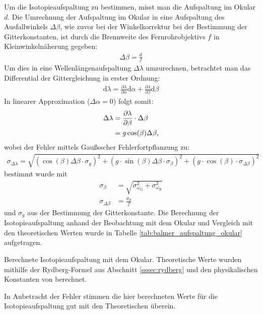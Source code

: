 \documentclass[11pt, a4paper]{article}
\numberwithin{equation}{section}
\begin{document}
Um die Isotopieaufspaltung zu bestimmen, misst man die Aufspaltung im Okular $d$.
Die Umrechnung der Aufspaltung im Okular in eine Aufspaltung des Ausfallwinkels $\Delta \beta$, wie zuvor bei der Winkelkorrektur bei der Bestimmung der Gitterkonstanten, ist durch die Brennweite des Fernrohrobjektivs $f$ in Kleinwinkelnäherung gegeben:
\begin{align*}
  \Delta \beta = \frac{d}{f}
\end{align*}
Um dies in eine Wellenlängenaufspaltung $\Delta \lambda$ umzurechnen, betrachtet man das Differential der Gittergleichung in erster Ordnung:
\begin{align*}
  \mathrm{d}\lambda = \frac{\partial \lambda}{\partial \alpha} \mathrm{d}\alpha + \frac{\partial \lambda}{\partial \beta} \mathrm{d}\beta
\end{align*}
In linearer Approximation ($\Delta \alpha = \num{0}$) folgt somit:
\begin{align}
  \Delta \lambda &= \frac{\partial \lambda}{\partial \beta} \cdot \Delta \beta \notag\\
  &= g \cos(\beta) \Delta \beta \text{,}
  \label{eq:gitter_differenzial}
\end{align}
wobei der Fehler mittels Gaußsscher Fehlerfortpflanzung zu:
\begin{align*}
	\sigma_{\Delta \lambda} = \sqrt{\left( \cos(\beta) \Delta \beta \cdot \sigma_g \right)^2 + \left( g \cdot \sin(\beta) \Delta \beta \cdot \sigma_\beta \right)^2 + \left( g \cdot \cos(\beta) \cdot \sigma_{\Delta \beta}\right)^2}
\end{align*}
bestimmt wurde mit
\begin{align*}
	\sigma_\beta &= \sqrt{\sigma_{\omega_\mathrm{G}}^2 + \sigma_{\omega_\mathrm{B}}^2}\\
	\sigma_{\Delta \beta} &= \frac{\sigma_d}{f}
\end{align*}
und $\sigma_g$ aus der Bestimmung der Gitterkonstante.
Die Berechnung der Isotopieaufspaltung anhand der Beobachtung mit dem Okular und Vergleich mit den theoretischen Werten wurde in Tabelle \ref{tab:balmer_aufspaltung_okular} aufgetragen.
\begin{table}[h]
	\centering
	
	\caption{Berechnete Isotopieaufspaltung mit dem Okular. Theoretische Werte wurden mithilfe der Rydberg-Formel aus Abschnitt \ref{sssec:rydberg} und den physikalischen Konstanten von \cite{CODATA} berechnet.}
	\label{tab:balmer_aufspaltung_okular}
\end{table}
In Anbetracht der Fehler stimmen die hier berechneten Werte für die Isotopieaufspaltung gut mit den Theoretischen überein.
\end{document}

